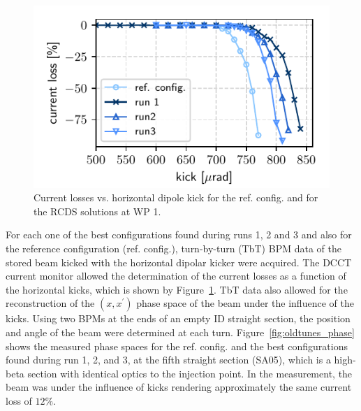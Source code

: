 \documentclass[a4paper,
               keeplastbox,   %
               ]{jacow}
\begin{document}
\begin{figure}[!h]
   \includegraphics[width=\columnwidth]{WEPL087_f1.pdf}
   \caption{Current losses vs. horizontal dipole kick for the ref. config. and for the RCDS solutions at WP 1.}
   \label{fig:loss_kicks}
\end{figure}
For each one of the best configurations found during runs 1, 2 and 3 and also for the reference configuration (ref. config.), turn-by-turn (TbT) BPM data of the stored beam kicked with the horizontal dipolar kicker were acquired. The DCCT current monitor allowed the determination of the current losses as a function of the horizontal kicks, which is shown by Figure~\ref{fig:loss_kicks}. 
TbT data also allowed for the reconstruction of the $(x,x^\prime)$ phase space of the beam under the influence of the kicks. Using two BPMs at the ends of an empty ID straight section, the position and angle of the beam were determined at each turn. 
Figure~\ref{fig:oldtunes_phase} shows the measured phase spaces for the ref. config. and the best configurations found during run 1, 2, and 3, at the fifth straight section (SA05), which is a high-beta section with identical optics to the injection point. In the measurement, the beam was under the influence of kicks rendering approximately the same current loss of $12\%$.
\end{document}
